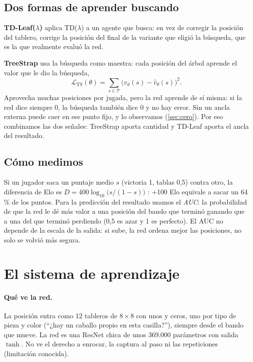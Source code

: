 \documentclass[11pt,a4paper]{article}
\newcommand{\vhat}{\hat v_\theta}
\begin{document}
\subsection{Dos formas de aprender buscando}

\textbf{TD-Leaf($\lambda$)} \citep{baxter2000} aplica TD($\lambda$) a un
agente que busca: en vez de corregir la posición del tablero, corrige la
posición del final de la variante que eligió la búsqueda, que es la que
realmente evaluó la red.

\textbf{TreeStrap} \citep{veness2009} usa la búsqueda como maestra: cada
posición del árbol aprende el valor que le dio la búsqueda,
\begin{equation}
\mathcal{L}_{\text{TS}}(\theta)=\sum_{s\in\mathcal{T}}\big(v_d(s)-\vhat(s)\big)^2 .
\end{equation}
Aprovecha muchas posiciones por jugada, pero la red aprende de sí misma:
si la red dice siempre 0, la búsqueda también dice 0 y no hay error. Sin un
ancla externa puede caer en ese punto fijo, y lo observamos
(\cref{sec:cero}). Por eso combinamos las dos señales: TreeStrap aporta
cantidad y TD-Leaf aporta el ancla del resultado.

\subsection{Cómo medimos}

Si un jugador saca un puntaje medio $s$ (victoria 1, tablas 0,5) contra
otro, la diferencia de Elo es $D=400\log_{10}\!\big(s/(1-s)\big)$
\citep{elo1978}: +100 Elo equivale a sacar un 64\,\% de los puntos. Para la
predicción del resultado usamos el \emph{AUC}: la probabilidad de que la red
le dé más valor a una posición del bando que terminó ganando que a una del
que terminó perdiendo (0,5 es azar y 1 es perfecto). El AUC no depende de la
escala de la salida: si sube, la red ordena mejor las posiciones, no
solo se volvió más segura.

\section{El sistema de aprendizaje}

\paragraph{Qué ve la red.} La posición entra como 12 tableros de $8\times8$
con unos y ceros, uno por tipo de pieza y color (``¿hay un caballo propio
en esta casilla?''), siempre desde el bando que mueve. La red es una ResNet
chica \citep{he2016} de unos 369.000 parámetros con salida $\tanh$. No ve el
derecho a enrocar, la captura al paso ni las repeticiones (limitación
conocida).
\end{document}
